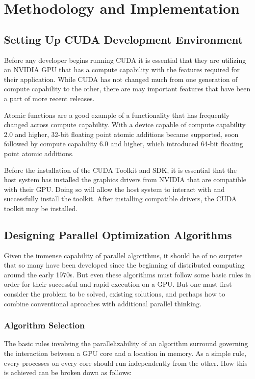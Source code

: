 \documentclass[11pt]{report}
\begin{document}
\chapter{Methodology and Implementation}

    \section{Setting Up CUDA Development Environment}
    Before any developer begins running CUDA it is essential that they are utilizing an NVIDIA GPU that has a compute capability with the features required for their application. While CUDA has not changed much from one generation of compute capability to the other, there are may important features that have been a part of more recent releases.

    Atomic functions are a good example of a functionality that has frequently changed across compute capability. With a device capable of compute capability 2.0 and higher, 32-bit floating point atomic additions became supported, soon followed by compute capability 6.0 and higher, which introduced 64-bit floating point atomic additions\cite{CPP_GUIDE}.

    Before the installation of the CUDA Toolkit and SDK, it is essential that the host system has installed the graphics drivers from NVIDIA that are compatible with their GPU. Doing so will allow the host system to interact with and successfully install the toolkit. After installing compatible drivers, the CUDA toolkit may be installed. 


    \section{Designing Parallel Optimization Algorithms}
    Given the immense capability of parallel algorithms, it should be of no surprise that so many have been developed since the beginning of distributed computing around the early 1970s. But even these algorithms must follow some basic rules in order for their successful and rapid execution on a GPU. But one must first consider the problem to be solved, existing solutions, and perhaps how to combine conventional aproaches with additional parallel thinking.
    
        \subsection{Algorithm Selection}
        The basic rules involving the parallelizability of an algorithm surround governing the interaction between a GPU core and a location in memory. As a simple rule, every processes on every core should run independently from the other. How this is achieved can be broken down as follows:
\end{document}
